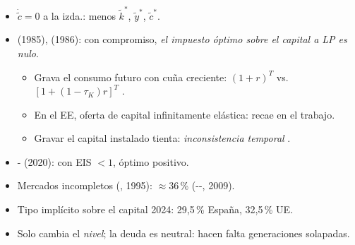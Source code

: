 \documentclass{article}
\begin{document}
\begin{columnas}
\begin{itemize}
\begin{itemize}
  \item $\dot{\tilde c}=0$ a la izda.: menos $\tilde k^*$, $\tilde y^*$, $\tilde c^*$.
  \end{itemize}
\end{itemize}
\begin{itemize}
\item {} (1985),  (1986): con compromiso, \emph{el impuesto óptimo sobre el capital a LP es nulo}.
  \begin{itemize}
  \item Grava el consumo futuro con cuña creciente: $(1+r)^T$ vs. $[1+(1-\tau_K)r]^T$ .
  \item En el EE, oferta de capital infinitamente elástica: recae en el trabajo.
  \item Gravar el capital instalado tienta: \emph{inconsistencia temporal} .
  \end{itemize}
\end{itemize}
\begin{itemize}
\item {}- (2020): con EIS $<1$, óptimo positivo.
\item Mercados incompletos (, 1995): $\approx$36\,\% (--, 2009).
\item Tipo implícito sobre el capital 2024: 29,5\,\% España, 32,5\,\% UE.
\item Solo cambia el \emph{nivel}; la deuda es neutral: hacen falta generaciones solapadas.
\end{itemize}


\end{columnas}
\end{document}
